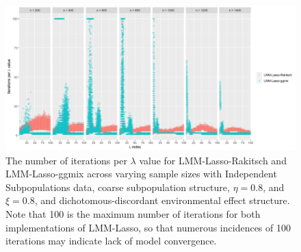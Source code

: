 \begin{landscape}
\begin{figure}[H]
    \centering
    \includegraphics[scale = 0.8]{figures/niter_perLambda_point.png}
    \caption{The number of iterations per $\lambda$ value for LMM-Lasso-Rakitsch and LMM-Lasso-ggmix across varying sample sizes with Independent Subpopulations data, coarse subpopulation structure, $\eta = 0.8$, and $\xi = 0.8$, and dichotomous-discordant environmental effect structure. Note that 100 is the maximum number of iterations for both implementations of LMM-Lasso, so that numerous incidences of 100 iterations may indicate lack of model convergence.}
    \label{fig:niter}
\end{figure}
\end{landscape}